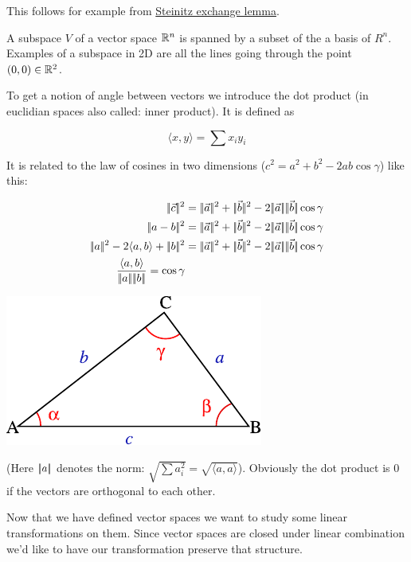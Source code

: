 This follows for example from \href{http://en.wikipedia.org/wiki/Steinitz_exchange_lemma}{Steinitz exchange lemma}.

\begin{Def}[Subspace]
 A subspace $V$ of a vector space $\mathbb{R}^n$ is spanned by a subset of the a basis of $R^n$. Examples of a subspace in 2D are all the lines going through the point $(0,0) \in \mathbb{R}^2$.
\end{Def}

To get a notion of angle between vectors we introduce the dot product (in euclidian spaces also called: inner product). It is defined as

\[\langle x,y\rangle  = \sum x_iy_i\]

It is related to the law of cosines in two dimensions ($c^2 = a^2+b^2-2ab\cos \gamma$) like this:

\begin{minipage}[hbt]{0.5\linewidth}
\begin{align*}
\norm{\vec c}^2 &= \norm{\vec a}^2 + \norm{\vec b}^2 -2\norm{\vec a}\norm{\vec b}\cos \gamma\\
\norm{a-b}^2 &= \norm{\vec a}^2 + \norm{\vec b}^2 -2\norm{\vec a}\norm{\vec b}\cos \gamma\\
\norm{a}^2-2\langle a,b\rangle +\norm{b}^2 &= \norm{\vec a}^2 + \norm{\vec b}^2 -2\norm{\vec a}\norm{\vec b}\cos \gamma\\
\frac{\langle a,b\rangle }{\norm{a}\norm{b}} = \cos \gamma
\end{align*}
\end{minipage}
\hfill
\begin{minipage}[hbt]{0.3\linewidth}
\includegraphics[scale=0.8]{./images/Triangle_with_notations_2.pdf}
\end{minipage}

\bigskip
(Here $|\!|a|\!|$ denotes the norm: $\sqrt{\sum a_i^2} = \sqrt{\langle a,a\rangle }$). Obviously the dot product is 0 if the vectors are orthogonal to each other.

Now that we have defined vector spaces we want to study some linear transformations on them. Since vector spaces are closed under linear combination we'd like to have our transformation preserve that structure.

